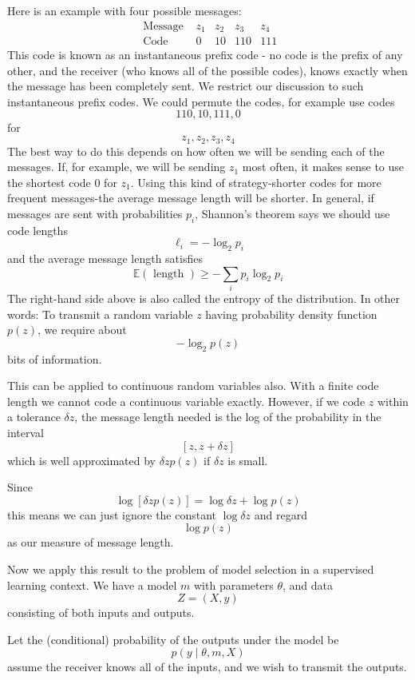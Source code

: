 \documentclass[11pt]{article}
\theoremstyle{plain} %
\theoremstyle{remark}
\begin{document}
Here is an example with four possible messages:
$$
\begin{array}{ccccc}
\text { Message } & z_{1} & z_{2} & z_{3} & z_{4} \\
\text { Code } & 0 & 10 & 110 & 111
\end{array}
$$
This code is known as an instantaneous prefix code - no code is the
  prefix of any other, and the receiver (who knows all of the possible codes),
  knows exactly when the message has been completely sent. We restrict our discussion to such instantaneous prefix codes. We could permute the codes, for example use codes
$$
110,10,111,0
$$
for
$$
z_{1}, z_{2}, z_{3}, z_{4}
$$
The best way to do this depends on how often we will be sending each of
  the messages. If, for example, we will be sending $z_{1}$ most often, it makes sense
  to use the shortest code 0 for $z_{1}$. Using this kind of strategy-shorter codes for more frequent messages-the
  average message length will be shorter. In general, if messages are sent with probabilities $p_{i}$, Shannon's
  theorem says we should use code lengths
$$
\ell_{i}=-\log _{2} p_{i}
$$
and the average message length satisfies
$$
\mathbb{E}(\text { length }) \geq-\sum_{i} p_{i} \log _{2} p_{i}
$$
The right-hand side above is also called the entropy of the
  distribution. In other words: To transmit a random variable $z$ having probability
  density function $p(z)$, we require about
$$
-\log _{2} p(z)
$$
bits of information.

This can be applied to continuous random variables also. With a finite code length we cannot code a continuous variable exactly. However, if we code $z$ within a tolerance $\delta z$, the message
  length needed is the log of the probability in the interval
$$
[z, z+\delta z]
$$
which is well approximated by $\delta z p(z)$ if $\delta z$ is small.

Since
$$
\log [\delta z p(z)]=\log \delta z+\log p(z)
$$
this means we can just ignore the constant $\log \delta z$ and regard
$$
\log p(z)
$$
as our measure of message length.

Now we apply this result to the problem of model selection in a
  supervised learning context. We have a model $m$ with parameters $\theta$, and data
$$
Z=(X, y)
$$
consisting of both inputs and outputs.

Let the (conditional) probability of the outputs under the model be
$$
p(y \mid \theta, m, X)
$$
assume the receiver knows all of the inputs, and we wish to transmit the
outputs.
\end{document}
